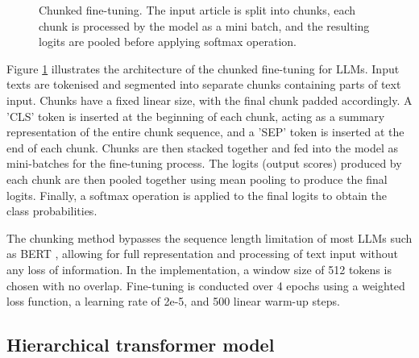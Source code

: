 \begin{figure}[htbp]
    \caption{Chunked fine-tuning. The input article is split into chunks, each chunk is processed by the model as a mini batch, and the resulting logits are pooled before applying softmax operation.}
    \label{fig:chunk_bert_finetuning}
\end{figure}

Figure \ref{fig:chunk_bert_finetuning} illustrates the architecture of the chunked fine-tuning for LLMs. Input texts are tokenised and segmented into separate chunks containing parts of text input. Chunks have a fixed linear size, with the final chunk padded accordingly. A 'CLS' token is inserted at the beginning of each chunk, acting as a summary representation of the entire chunk sequence, and a 'SEP' token is inserted at the end of each chunk. Chunks are then stacked together and fed into the model as mini-batches for the fine-tuning process. The logits (output scores) produced by each chunk are then pooled together using mean pooling to produce the final logits. Finally, a softmax operation is applied to the final logits to obtain the class probabilities.

The chunking method bypasses the sequence length limitation of most LLMs such as BERT \cite{devlin-2019-bert}, allowing for full representation and processing of text input without any loss of information. In the implementation, a window size of 512 tokens is chosen with no overlap. Fine-tuning is conducted over 4 epochs using a weighted loss function, a learning rate of 2e-5, and 500 linear warm-up steps.

\subsection{Hierarchical transformer model}

